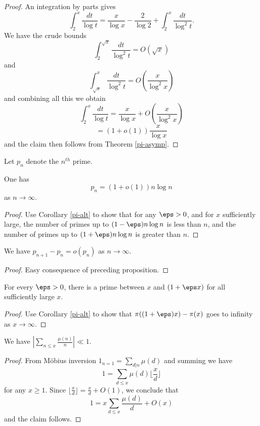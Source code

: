 \begin{proof} An integration by parts gives
  $$ \int_2^x \frac{dt}{\log t} = \frac{x}{\log x} - \frac{2}{\log 2} + \int_2^x \frac{dt}{\log^2 t}.$$
We have the crude bounds
$$ \int_2^{\sqrt{x}} \frac{dt}{\log^2 t} = O( \sqrt{x} )$$
and
$$ \int_{\sqrt{x}}^x \frac{dt}{\log^2 t} = O( \frac{x}{\log^2 x} )$$
and combining all this we obtain
$$ \int_2^x \frac{dt}{\log t} = \frac{x}{\log x} + O( \frac{x}{\log^2 x} )$$
$$ = (1+o(1)) \frac{x}{\log x}$$
and the claim then follows from Theorem \ref{pi-asymp}.
\end{proof}

Let $p_n$ denote the $n^{th}$ prime.

\begin{proposition} One has
  $$ p_n = (1+o(1)) n \log n$$
as $n \to \infty$.
\end{proposition}

\begin{proof}  Use Corollary \ref{pi-alt} to show that for any $\eps>0$, and for $x$ sufficiently large, the number of primes up to $(1-\eps) n \log n$ is less than $n$, and the number of primes up to $(1+\eps) n \log n$ is greater than $n$.
\end{proof}

\begin{corollary}  We have $p_{n+1} - p_n = o(p_n)$
  as $n \to \infty$.
\end{corollary}

\begin{proof}  Easy consequence of preceding proposition.
\end{proof}

\begin{corollary}  For every $\eps>0$, there is a prime between $x$ and $(1+\eps x)$ for all sufficiently large $x$.
\end{corollary}

\begin{proof}  Use Corollary \ref{pi-alt} to show that $\pi((1+\eps)x) - \pi(x)$ goes to infinity as $x \to \infty$.
\end{proof}

\begin{proposition}\label{mun}  We have $|\sum_{n \leq x} \frac{\mu(n)}{n}| \ll 1$.
\end{proposition}

\begin{proof}  From M\"obius inversion $1_{n=1} = \sum_{d|n} \mu(d)$ and summing we have
  $$ 1 = \sum_{d \leq x} \mu(d) \lfloor \frac{x}{d} \rfloor$$
  for any $x \geq 1$.  Since $\lfloor \frac{x}{d} \rfloor = \frac{x}{d} + O(1)$, we conclude that
  $$ 1 = x \sum_{d \leq x} \frac{\mu(d)}{d} + O(x)$$
  and the claim follows.
\end{proof}

